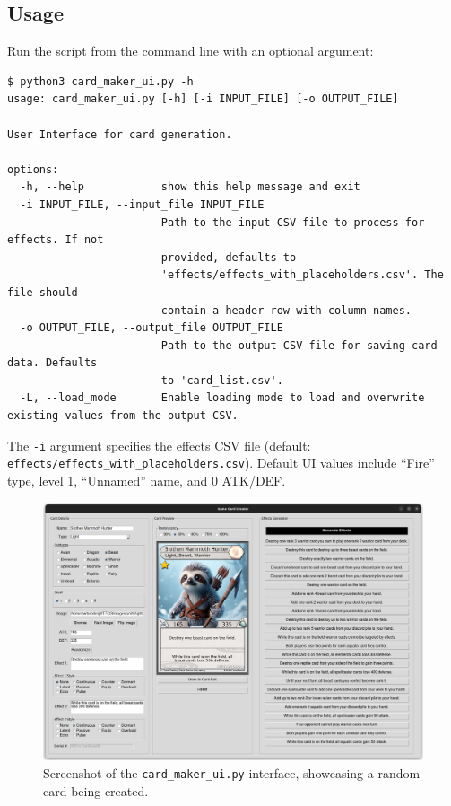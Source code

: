 \subsection{Usage}
Run the script from the command line with an optional argument:
\begin{lstlisting}[style=terminalstyle]
$ python3 card_maker_ui.py -h
usage: card_maker_ui.py [-h] [-i INPUT_FILE] [-o OUTPUT_FILE]

User Interface for card generation.

options:
  -h, --help            show this help message and exit
  -i INPUT_FILE, --input_file INPUT_FILE
                        Path to the input CSV file to process for effects. If not
                        provided, defaults to
                        'effects/effects_with_placeholders.csv'. The file should
                        contain a header row with column names.
  -o OUTPUT_FILE, --output_file OUTPUT_FILE
                        Path to the output CSV file for saving card data. Defaults
                        to 'card_list.csv'.
  -L, --load_mode       Enable loading mode to load and overwrite existing values from the output CSV.
\end{lstlisting}
The \texttt{-i} argument specifies the effects CSV file (default: \texttt{effects/effects\_with\_placeholders.csv}). Default UI values include ``Fire'' type, level 1, ``Unnamed'' name, and 0 ATK/DEF.

\begin{figure}[h]
	\centering
	\includegraphics[width=\textwidth]{images/ui_sample.png}
	\caption{Screenshot of the \texttt{card\_maker\_ui.py} interface, showcasing a random card being created.}
	\label{fig:card_maker_ui_screenshot}
\end{figure}

